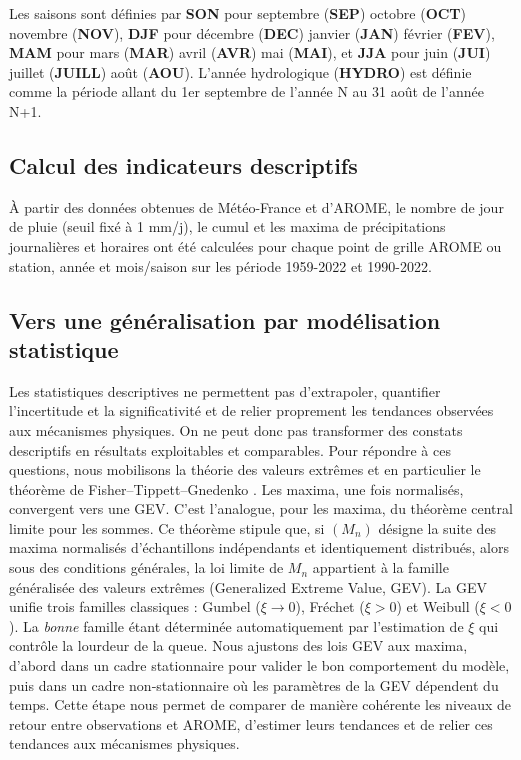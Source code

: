 \documentclass[
  article,
  nofooter,
  noheadings]{jss}
\begin{document}
Les saisons sont définies par \textbf{SON} pour septembre (\textbf{SEP})
octobre (\textbf{OCT}) novembre (\textbf{NOV}), \textbf{DJF} pour
décembre (\textbf{DEC}) janvier (\textbf{JAN}) février (\textbf{FEV}),
\textbf{MAM} pour mars (\textbf{MAR}) avril (\textbf{AVR}) mai
(\textbf{MAI}), et \textbf{JJA} pour juin (\textbf{JUI}) juillet
(\textbf{JUILL}) août (\textbf{AOU}). L'année hydrologique
(\textbf{HYDRO}) est définie comme la période allant du 1er septembre de
l'année N au 31 août de l'année N+1.

\subsection{Calcul des indicateurs
descriptifs}\label{calcul-des-indicateurs-descriptifs}

À partir des données obtenues de Météo-France et d'AROME, le nombre de
jour de pluie (seuil fixé à 1 mm/j), le cumul et les maxima de
précipitations journalières et horaires ont été calculées pour chaque
point de grille AROME ou station, année et mois/saison sur les période
1959-2022 et 1990-2022.

\subsection{Vers une généralisation par modélisation
statistique}\label{vers-une-guxe9nuxe9ralisation-par-moduxe9lisation-statistique}

Les statistiques descriptives ne permettent pas d'extrapoler, quantifier
l'incertitude et la significativité et de relier proprement les
tendances observées aux mécanismes physiques. On ne peut donc pas
transformer des constats descriptifs en résultats exploitables et
comparables. Pour répondre à ces questions, nous mobilisons la théorie
des valeurs extrêmes et en particulier le théorème de
Fisher--Tippett--Gnedenko \citep{coles2001introduction}. Les maxima, une
fois normalisés, convergent vers une GEV. C'est l'analogue, pour les
maxima, du théorème central limite pour les sommes. Ce théorème stipule
que, si \((M_n)\) désigne la suite des maxima normalisés d'échantillons
indépendants et identiquement distribués, alors sous des conditions
générales, la loi limite de \(M_n\) appartient à la famille généralisée
des valeurs extrêmes (Generalized Extreme Value, GEV). La GEV unifie
trois familles classiques : Gumbel (\(\xi \to 0\)), Fréchet
(\(\xi > 0\)) et Weibull (\(\xi < 0\)). La \emph{bonne} famille étant
déterminée automatiquement par l'estimation de \(\xi\) qui contrôle la
lourdeur de la queue. Nous ajustons des lois GEV aux maxima, d'abord
dans un cadre stationnaire pour valider le bon comportement du modèle,
puis dans un cadre non‑stationnaire où les paramètres de la GEV
dépendent du temps. Cette étape nous permet de comparer de manière
cohérente les niveaux de retour entre observations et AROME, d'estimer
leurs tendances et de relier ces tendances aux mécanismes physiques.
\end{document}
